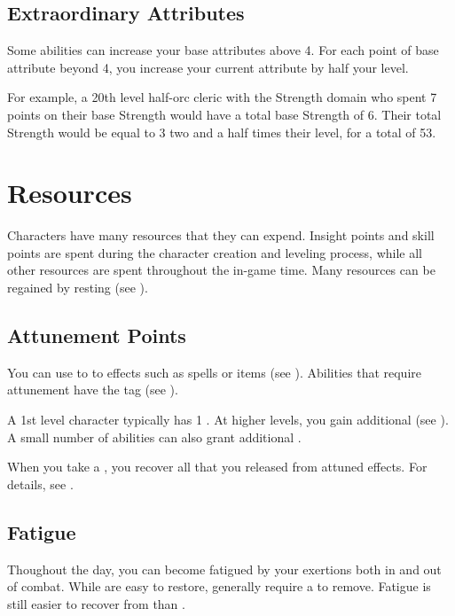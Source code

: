     \subsection{Extraordinary Attributes}
        Some abilities can increase your base attributes above 4.
        For each point of base attribute beyond 4, you increase your current attribute by half your level.

        For example, a 20th level half-orc cleric with the Strength domain who spent 7 points on their base Strength would have a total base Strength of 6.
        Their total Strength would be equal to 3 \add two and a half times their level, for a total of 53.

\section{Resources}\label{Resources}

    Characters have many resources that they can expend.
    Insight points and skill points are spent during the character creation and leveling process, while all other resources are spent throughout the in-game time.
    Many resources can be regained by resting (see ).

    \subsection{Attunement Points}\label{Attunement Points}
        You can use  to  to effects such as spells or items (see ).
        Abilities that require attunement have the  tag (see ).

        A 1st level character typically has 1 .
        At higher levels, you gain additional  (see ).
        A small number of abilities can also grant additional .

        When you take a , you recover all  that you released from attuned effects.
        For details, see .

    \subsection{Fatigue}\label{Fatigue}
        Thoughout the day, you can become fatigued by your exertions both in and out of combat.
        While  are easy to restore,  generally require a  to remove.
        Fatigue is still easier to recover from than .

